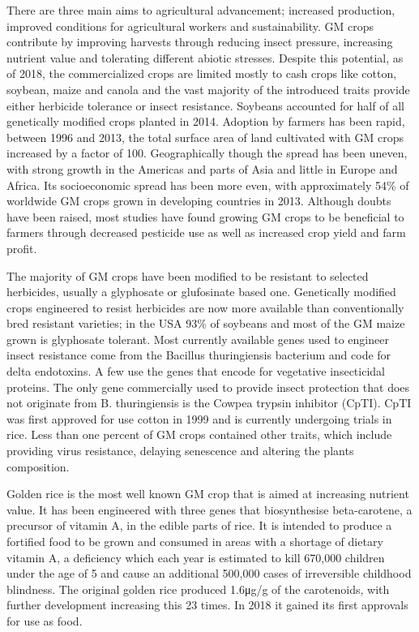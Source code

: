 There are three main aims to agricultural advancement; increased production, improved conditions for agricultural workers and sustainability. GM crops contribute by improving harvests through reducing insect pressure, increasing nutrient value and tolerating different abiotic stresses. Despite this potential, as of 2018, the commercialized crops are limited mostly to cash crops like cotton, soybean, maize and canola and the vast majority of the introduced traits provide either herbicide tolerance or insect resistance. Soybeans accounted for half of all genetically modified crops planted in 2014. Adoption by farmers has been rapid, between 1996 and 2013, the total surface area of land cultivated with GM crops increased by a factor of 100. Geographically though the spread has been uneven, with strong growth in the Americas and parts of Asia and little in Europe and Africa. Its socioeconomic spread has been more even, with approximately 54\% of worldwide GM crops grown in developing countries in 2013. Although doubts have been raised, most studies have found growing GM crops to be beneficial to farmers through decreased pesticide use as well as increased crop yield and farm profit.

The majority of GM crops have been modified to be resistant to selected herbicides, usually a glyphosate or glufosinate based one. Genetically modified crops engineered to resist herbicides are now more available than conventionally bred resistant varieties; in the USA 93\% of soybeans and most of the GM maize grown is glyphosate tolerant. Most currently available genes used to engineer insect resistance come from the Bacillus thuringiensis bacterium and code for delta endotoxins. A few use the genes that encode for vegetative insecticidal proteins. The only gene commercially used to provide insect protection that does not originate from B. thuringiensis is the Cowpea trypsin inhibitor (CpTI). CpTI was first approved for use cotton in 1999 and is currently undergoing trials in rice. Less than one percent of GM crops contained other traits, which include providing virus resistance, delaying senescence and altering the plants composition.

Golden rice is the most well known GM crop that is aimed at increasing nutrient value. It has been engineered with three genes that biosynthesise beta-carotene, a precursor of vitamin A, in the edible parts of rice. It is intended to produce a fortified food to be grown and consumed in areas with a shortage of dietary vitamin A, a deficiency which each year is estimated to kill 670,000 children under the age of 5 and cause an additional 500,000 cases of irreversible childhood blindness. The original golden rice produced 1.6μg/g of the carotenoids, with further development increasing this 23 times. In 2018 it gained its first approvals for use as food.

